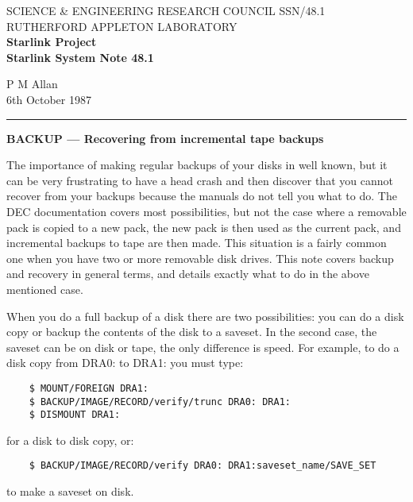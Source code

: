 \pagestyle{myheadings}
\setlength{\textwidth}{160mm}
\setlength{\textheight}{240mm}
\setlength{\topmargin}{-5mm}
\setlength{\oddsidemargin}{0mm}
\setlength{\evensidemargin}{0mm}
\setlength{\parindent}{0mm}
\setlength{\parskip}{\medskipamount}
\setlength{\unitlength}{1mm}


\thispagestyle{empty}
SCIENCE \& ENGINEERING RESEARCH COUNCIL \hfill SSN/48.1\\
RUTHERFORD APPLETON LABORATORY\\
{\large\bf Starlink Project\\}
{\large\bf Starlink System Note 48.1}
\begin{flushright}
P M Allan\\
6th October 1987
\end{flushright}
\vspace{-4mm}
\rule{\textwidth}{0.5mm}
\vspace{5mm}
\begin{center}
{\Large\bf BACKUP --- Recovering from incremental tape backups}
\end{center}
\vspace{5mm}

The importance of making regular backups of your disks in well known, but
it can be very frustrating to have a head crash and then discover that you
cannot recover from your backups because the manuals do not tell you what
to do.
The DEC documentation covers most possibilities, but not the case where a
removable pack is copied to a new pack, the new pack is then used as the
current pack, and incremental backups to tape are then made.
This situation is a fairly common one when you have two or more removable
disk drives.
This note covers backup and recovery in general terms, and details
exactly what to do in the above mentioned case.
                        
When you do a full backup of a disk there are two possibilities: you can
do a disk copy or backup the contents of the disk to a saveset.
In the second case, the saveset can be on disk or tape, the only difference is
speed.
For example, to do a disk copy from DRA0: to DRA1: you must type:
\begin{verbatim}
    $ MOUNT/FOREIGN DRA1: 
    $ BACKUP/IMAGE/RECORD/verify/trunc DRA0: DRA1:
    $ DISMOUNT DRA1:
\end{verbatim} 
for a disk to disk copy, or:
\begin{verbatim}
    $ BACKUP/IMAGE/RECORD/verify DRA0: DRA1:saveset_name/SAVE_SET
\end{verbatim} 
to make a saveset on disk. 

